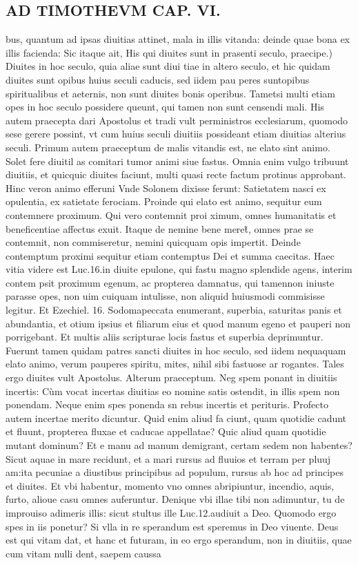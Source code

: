 \documentclass{article}
\begin{document}
\begin{pages}
\section*{AD TIMOTHEVM CAP. VI. }
\marginpar{[ p.131 ]}\pstart bus, quantum ad ipsas diuitias attinet, mala in illis vitanda: deinde quae bona ex illis facienda: Sic itaque ait,  \pend\pstart His qui diuites sunt in prasenti seculo, praecipe.) Diuites in hoc seculo, quia aliae sunt diui tiae in altero seculo, et hic quidam diuites sunt opibus huius seculi caducis, sed iidem pau peres suntopibus spiritualibus et aeternis, non sunt diuites bonis operibus. Tametsi multi etiam opes in hoc seculo possidere queunt, qui tamen non sunt censendi mali. His autem praecepta dari Apostolus et tradi vult perministros ecclesiarum, quomodo sese gerere possint, vt cum huius seculi diuitiis possideant etiam diuitias alterius seculi.  \pend\pstart Primum autem praeceptum de malis vitandis est, ne elato sint animo. Solet fere diuitil as comitari tumor animi siue fastus. Omnia enim vulgo tribuunt diuitiis, et quicquic diuites faciunt, multi quasi recte factum protinus approbant. Hinc veron animo efferuni Vnde Solonem dixisse ferunt: Satietatem nasci ex opulentia, ex satietate ferociam. Proinde qui elato est animo, sequitur eum contemnere proximum. Qui vero contemnit proi ximum, omnes humanitatis et beneficentiae affectus exuit. Itaque de nemine bene meret̃, omnes prae se contemnit, non commiseretur, nemini quicquam opis impertit. Deinde contemptum proximi sequitur etiam contemptus Dei et summa caecitas. Haec vitia videre est Luc.16.in diuite epulone, qui fastu magno splendide agens, interim contem psit proximum egenum, ac propterea damnatus, qui tamennon iniuste parasse opes, non uim cuiquam intulisse, non aliquid huiusmodi commisisse legitur. Et Ezechiel. 16. Sodomapeccata enumerant, superbia, saturitas panis et abundantia, et otium ipsius et filiarum eius et quod manum egeno et pauperi non porrigebant. Et multis aliis scripturae locis fastus et superbia deprimuntur. Fuerunt tamen quidam patres sancti diuites in hoc seculo, sed iidem nequaquam elato animo, verum pauperes spiritu, mites, nihil sibi fastuose ar rogantes. Tales ergo diuites vult Apostolus.  \pend\pstart Alterum praeceptum. Neg spem ponant in diuitiis incertis: Cùm vocat incertas diuitias eo nomine satis ostendit, in illis spem non ponendam. Neque enim spes ponenda sn rebus incertis et perituris. Profecto autem incertae merito dicuntur. Quid enim aliud fa ciunt, quam quotidie cadunt et fluunt, propterea fluxae et caducae appellatae? Quic aliud quam quotidie mutant dominum? Et e manu ad manum demigrant, certam sedem non habentes? Sicut aquae in mare recidunt, et a mari rursus ad fluuios et terram per pluuj am:ita pecuniae a diustibus principibus ad populum, rursus ab hoc ad principes et diuites. Et vbi habentur, momento vno omnes abripiuntur, incendio, aquis, furto, alioue casu omnes auferuntur. Denique vbi illae tibi non adimuntur, tu de improuiso adimeris illis: sicut stultus ille Luc.12.audiuit a Deo. Quomodo ergo spes in iis ponetur? Si vlla in re sperandum est speremus in Deo viuente. Deus est qui vitam dat, et hanc et futuram, in eo ergo sperandum, non in diuitiis, quae cum vitam nulli dent, saepem caussa 
\end{pages}
\end{document}
